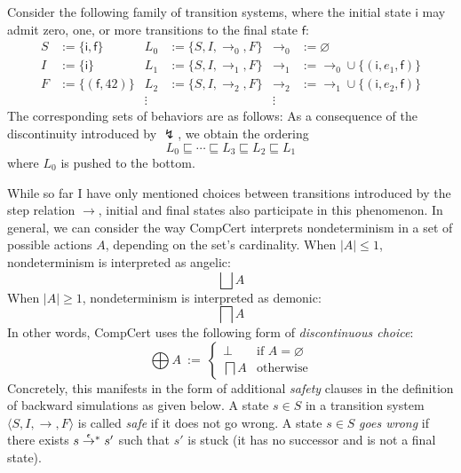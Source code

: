 \documentclass[sigplan,10pt,review,anonymous]{acmart}
\newcommand{\kw}[1]{\ensuremath{ \mathsf{#1} }}
\newcommand{\refby}{\sqsubseteq}
\begin{document}
\begin{example} %
Consider the following family of transition systems,
where the initial state $\kw{i}$ may admit zero, one, or more
transitions to the final state $\kw{f}$:
\begin{align*}
  S &:= \{ \kw{i}, \kw{f} \} &
  L_0 &:= \{ S, I, {\rightarrow_0}, F \} &
  {\rightarrow_0} &:= \varnothing \\
  I &:= \{ \kw{i} \} &
  L_1 &:= \{ S, I, {\rightarrow_1}, F \} &
  {\rightarrow_1} &:= {\rightarrow_0} \cup
    \{ (\kw{i}, e_1, \kw{f}) \} \\
  F &:= \{ (\kw{f}, 42) \} &
  L_2 &:= \{ S, I, {\rightarrow_2}, F \} &
  {\rightarrow_2} &:= {\rightarrow_1} \cup
    \{ (\kw{i}, e_2, \kw{f}) \} \\
  & & \vdots \: & & \vdots \:\:
\end{align*}
The corresponding sets of behaviors are as follows:
As a consequence of the discontinuity introduced by $\lightning$,
we obtain the ordering
\[
  L_0 \refby \cdots \refby L_3 \refby L_2 \refby L_1
\]
where $L_0$ is pushed to the bottom.
\end{example}

While so far I have only mentioned
choices between transitions
introduced by the step relation $\rightarrow$,
initial and final states also participate in this phenomenon.
In general,
we can consider the way CompCert interprets nondeterminism
in a set of possible actions $A$,
depending on the set's cardinality.
When $|A| \le 1$, nondeterminism is interpreted as angelic:
\[
  \bigsqcup A
\]
When $|A| \ge 1$, nondeterminism is interpreted as demonic:
\[
  \bigsqcap A
\]
In other words, CompCert uses the following form of
\emph{discontinuous choice}:
\[
  \bigoplus A \: := \:
  \begin{cases}
    \bot & \mbox{if } A = \varnothing \\
    \bigsqcap A & \mbox{otherwise}
  \end{cases}
\]
Concretely, this manifests in the form of additional
\emph{safety} clauses
in the definition of backward simulations
as given below.
A state $s \in S$
in a transition system $\langle S, I, {\rightarrow}, F \rangle$
is called \emph{safe}
if it does not go wrong.
A state $s \in S$
\emph{goes wrong} if there exists
$s \mathrel{\smash{\stackrel{\epsilon}{\rightarrow}}^*} s'$
such that $s'$ is stuck
(it has no successor and is not a final state).
\end{document}

